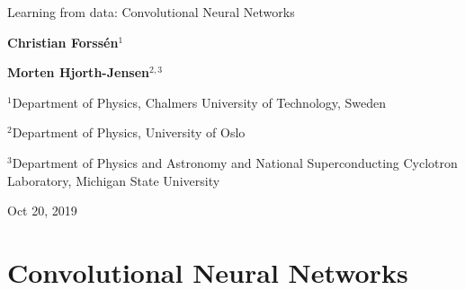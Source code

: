 \documentclass[%
oneside,                 %
final,                   %
10pt]{article}
\begin{document}

\newcommand{\exercisesection}[1]{\subsection*{#1}}







\thispagestyle{empty}

\begin{center}
{\LARGE\bf
\begin{spacing}{1.25}
Learning from data: Convolutional Neural Networks
\end{spacing}
}
\end{center}


\begin{center}
{\bf Christian Forssén${}^{1}$} \\ [0mm]
\end{center}


\begin{center}
{\bf Morten Hjorth-Jensen${}^{2, 3}$} \\ [0mm]
\end{center}

\begin{center}
\centerline{{\small ${}^1$Department of Physics, Chalmers University of Technology, Sweden}}
\centerline{{\small ${}^2$Department of Physics, University of Oslo}}
\centerline{{\small ${}^3$Department of Physics and Astronomy and National Superconducting Cyclotron Laboratory, Michigan State University}}
\end{center}
    

\begin{center}
Oct 20, 2019
\end{center}

\vspace{1cm}


\section{Convolutional Neural Networks}
\end{document}
